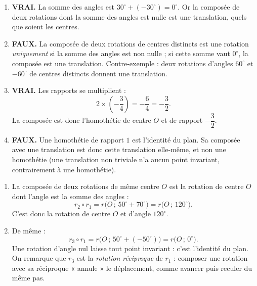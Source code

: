 \documentclass[11pt]{article}
\newcommand{\cle}[1]{{\popxbold\color{popdark}#1}}
\begin{document}
\begin{corrige}
\begin{enumerate}
\item \textbf{VRAI.} La somme des angles est $30^{\circ}+(-30^{\circ})=0^{\circ}$. Or la composée de deux rotations dont la somme des angles est nulle est une \cle{translation}, quels que soient les centres.
\item \textbf{FAUX.} La composée de deux rotations de centres distincts est une rotation \emph{uniquement} si la somme des angles est non nulle ; si cette somme vaut $0^{\circ}$, la composée est une translation. Contre-exemple : deux rotations d'angles $60^{\circ}$ et $-60^{\circ}$ de centres distincts donnent une translation.
\item \textbf{VRAI.} Les rapports se multiplient :
\[ 2\times\left(-\dfrac{3}{4}\right)=-\dfrac{6}{4}=-\dfrac{3}{2}. \]
La composée est donc l'homothétie de centre $O$ et de rapport $-\dfrac{3}{2}$.
\item \textbf{FAUX.} Une homothétie de rapport $1$ est l'identité du plan. Sa composée avec une translation est donc cette \cle{translation} elle-même, et non une homothétie (une translation non triviale n'a aucun point invariant, contrairement à une homothétie).
\end{enumerate}
\end{corrige}

\begin{corrige}
\begin{enumerate}
\item La composée de deux rotations de même centre $O$ est la rotation de centre $O$ dont l'angle est la somme des angles :
\[ r_2\circ r_1 = r\big(O\,;\,50^{\circ}+70^{\circ}\big)=r\big(O\,;\,120^{\circ}\big). \]
C'est donc la \cle{rotation} de centre $O$ et d'angle $120^{\circ}$.
\item De même :
\[ r_3\circ r_1 = r\big(O\,;\,50^{\circ}+(-50^{\circ})\big)=r\big(O\,;\,0^{\circ}\big). \]
Une rotation d'angle nul laisse tout point invariant : c'est l'\cle{identité} du plan. On remarque que $r_3$ est la \emph{rotation réciproque} de $r_1$ : composer une rotation avec sa réciproque « annule » le déplacement, comme avancer puis reculer du même pas.
\end{enumerate}
\end{corrige}
\end{document}
